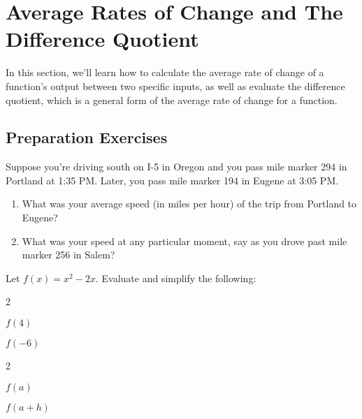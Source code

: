 
\section{Average Rates of Change and The Difference Quotient} \label{functions-difference-quotient}

In this section, we'll learn how to calculate the average rate of change of a function's output between two specific inputs, as well as evaluate the difference quotient, which is a general form of the average rate of change for a function.\\[0.5em]




\subsection*{Preparation Exercises} \label{prep-difference-quotient}

\begin{myPrep}
Suppose you're driving south on I-5 in Oregon and you pass mile marker 294 in Portland at 1:35 PM.  Later, you pass mile marker 194 in Eugene at 3:05 PM. 
	\begin{enumerate}
		\item What was your average speed (in miles per hour) of the trip from Portland to Eugene?
		\vfill
		\item What was your speed at any particular moment, say as you drove past mile marker 256 in Salem?
		\vfill
	\end{enumerate}
\end{myPrep}

\begin{myPrep}
Let $f(x) = x^2 - 2x$.  Evaluate and simplify the following:
	\begin{enumerate}
		\vfill
		\vfill
	\end{enumerate}
\end{myPrep}

